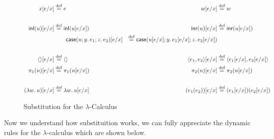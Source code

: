 \begin{figure}
    \vspace*{-1em}
    \begin{align*}
        x[e/x] &\EqDef e &w[e/x] &\EqDef w \\\\
        \LamInl{u}[e/x] &\EqDef \LamInl{u[e/x]} &\LamInr{u}[e/x] &\EqDef \LamInr{u[e/x]} \\
        &\qquad \LamCase{u}{y}{e_1}{z}{e_2}[e/x] &\EqDef \LamCase{u[e/x]}{y}{e_1[e/x]}{z}{e_2[e/x]} \\\\
        \UnitV[e/x] &\EqDef \UnitV &\Tuple{e_1}{e_2}[e/x] &\EqDef \Tuple{e_1[e/x]}{e_2[e/x]} \\
        \Proj{u}[e/x] &\EqDef \Proj{u[e/x]} &\Proj[2]{u}[e/x] &\EqDef \Proj[2]{u[e/x]} \\\\
        (\Lam{w}{u})[e/x] &\EqDef \Lam{w}{u[e/x]} &(e_1 (e_2))[e/x] &\EqDef (e_1[e/x])(e_2[e/x]) \\      
    \end{align*}
    \caption{Substitution for the $\lambda$-Calculus}
    \label{fig: dr stlc}
\end{figure}

\noindent
Now we understand how substituition works, we can fully appreciate the dynamic rules 
for the $\lambda$-calculus which are shown below.

